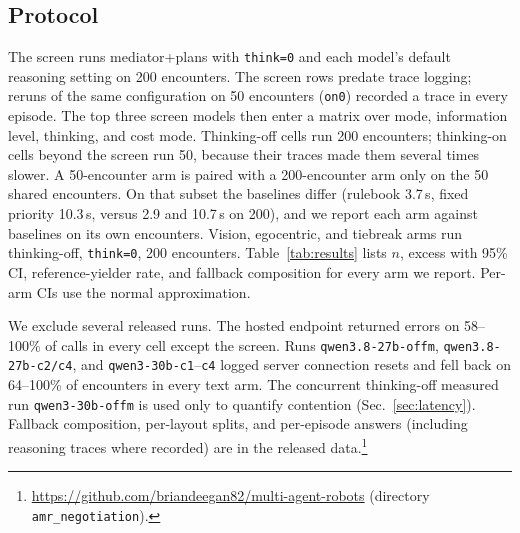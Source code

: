 \documentclass[journal]{IEEEtran}
\begin{document}
\subsection{Protocol}
\label{sec:protocol}
The screen runs mediator+plans with \texttt{think=0} and each model's default reasoning setting on 200 encounters. The screen rows predate trace logging; reruns of the same configuration on 50 encounters (\texttt{on0}) recorded a trace in every episode. The top three screen models then enter a matrix over mode, information level, thinking, and cost mode. Thinking-off cells run 200 encounters; thinking-on cells beyond the screen run 50, because their traces made them several times slower. A 50-encounter arm is paired with a 200-encounter arm only on the 50 shared encounters. On that subset the baselines differ (rulebook 3.7\,s, fixed priority 10.3\,s, versus 2.9 and 10.7\,s on 200), and we report each arm against baselines on its own encounters. Vision, egocentric, and tiebreak arms run thinking-off, \texttt{think=0}, 200 encounters. Table~\ref{tab:results} lists $n$, excess with 95\% CI, reference-yielder rate, and fallback composition for every arm we report. Per-arm CIs use the normal approximation. %

We exclude several released runs. The hosted endpoint returned errors on 58--100\% of calls in every cell except the screen. Runs \texttt{qwen3.8-27b-offm}, \texttt{qwen3.8-27b-c2/c4}, and \texttt{qwen3-30b-c1}--\texttt{c4} logged server connection resets and fell back on 64--100\% of encounters in every text arm. The concurrent thinking-off measured run \texttt{qwen3-30b-offm} is used only to quantify contention (Sec.~\ref{sec:latency}). Fallback composition, per-layout splits, and per-episode answers (including reasoning traces where recorded) are in the released data.\footnote{\url{https://github.com/briandeegan82/multi-agent-robots} (directory \texttt{amr\_negotiation}). %
}
\end{document}
